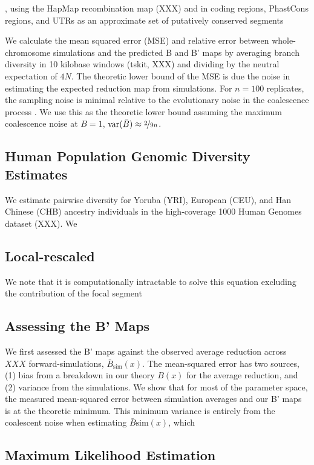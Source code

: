 \documentclass[11pt]{article}
\DeclareMathOperator{\var}{var}
\begin{document}
, using the HapMap recombination map (XXX) and in coding regions, PhastCons
regions, and UTRs as an approximate set of putatively conserved segments

We calculate the mean squared error (MSE) and relative error between
whole-chromosome simulations and the predicted B and B' maps by averaging
branch diversity in 10 kilobase windows (tskit, XXX) and dividing by the
neutral expectation of $4N$. The theoretic lower bound of the MSE is due the
noise in estimating the expected reduction map from simulations. For $n=100$
replicates, the sampling noise is minimal relative to the evolutionary noise in
the coalescence process \parencite{Tajima1983-gu}. We use this as the theoretic
lower bound assuming the maximum coalescence noise at $B=1$, $\var(\bar{B})
\approx \nicefrac{2}{9n}$.

\subsection*{Human Population Genomic Diversity Estimates}

We estimate pairwise diversity for Yoruba (YRI), European (CEU), and Han
Chinese (CHB) ancestry individuals in the high-coverage 1000 Human Genomes
dataset (XXX). We 

\subsection*{Local-rescaled }
We note that it is computationally intractable to solve this equation excluding
the contribution of the focal segment 

\subsection*{Assessing the B' Maps}

We first assessed the B' maps against the observed average reduction across
$XXX$ forward-simulations, $\bar{B}_\text{sim}(x)$. The mean-squared error has
two sources, (1) bias from a breakdown in our theory $B(x)$ for the average
reduction, and (2) variance from the simulations. We show that for most of the
parameter space, the measured mean-squared error between simulation averages
and our B' maps is at the theoretic minimum. This minimum variance is entirely
from the coalescent noise when estimating $\bar{B}\text{sim}(x)$, which 

\subsection*{Maximum Likelihood Estimation}
\end{document}
